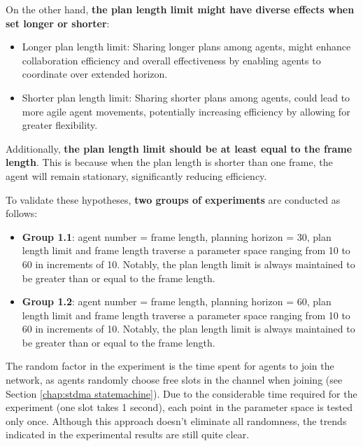 On the other hand, \textbf{the plan length limit might have diverse effects when set longer or shorter}:
\begin{itemize}
    \item Longer plan length limit: Sharing longer plans among agents, might enhance collaboration efficiency and overall effectiveness by enabling agents to coordinate over extended horizon.
    \item Shorter plan length limit: Sharing shorter plans among agents, could lead to more agile agent movements, potentially increasing efficiency by allowing for greater flexibility.
\end{itemize}

Additionally, \textbf{the plan length limit should be at least equal to the frame length}. This is because when the plan length is shorter than one frame, the agent will remain stationary, significantly reducing efficiency.

To validate these hypotheses, \textbf{two groups of experiments} are conducted as follows:
\begin{itemize}
    \item \textbf{Group 1.1}: agent number = frame length, planning horizon = 30, plan length limit and frame length traverse a parameter space ranging from 10 to 60 in increments of 10. Notably, the plan length limit is always maintained to be greater than or equal to the frame length.
    \item \textbf{Group 1.2}: agent number = frame length, planning horizon = 60, plan length limit and frame length traverse a parameter space ranging from 10 to 60 in increments of 10. Notably, the plan length limit is always maintained to be greater than or equal to the frame length.
\end{itemize}

The random factor in the experiment is the time spent for agents to join the network, as agents randomly choose free slots in the channel when joining (see Section \ref{chap:stdma statemachine}).
Due to the considerable time required for the experiment (one slot takes 1 second), each point in the parameter space is tested only once.
Although this approach doesn't eliminate all randomness, the trends indicated in the experimental results are still quite clear.

